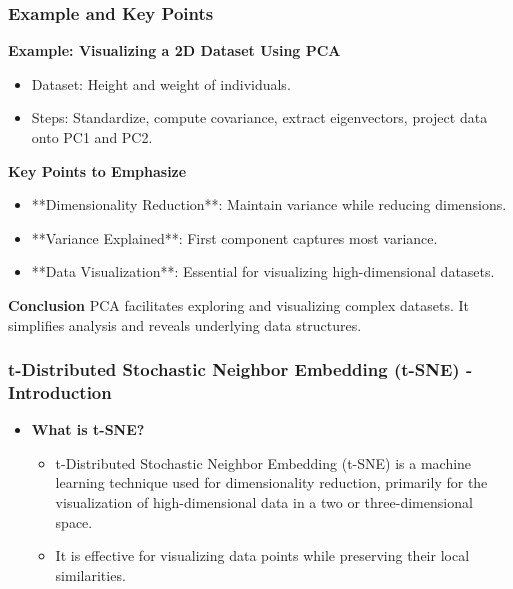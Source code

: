 \documentclass{beamer}
\begin{document}
\begin{frame}[fragile]
    \frametitle{Example and Key Points}
    \textbf{Example: Visualizing a 2D Dataset Using PCA}
    \begin{itemize}
        \item Dataset: Height and weight of individuals.
        \item Steps: Standardize, compute covariance, extract eigenvectors, project data onto PC1 and PC2.
    \end{itemize}
    
    \textbf{Key Points to Emphasize}
    \begin{itemize}
        \item **Dimensionality Reduction**: Maintain variance while reducing dimensions.
        \item **Variance Explained**: First component captures most variance.
        \item **Data Visualization**: Essential for visualizing high-dimensional datasets.
    \end{itemize}

    \textbf{Conclusion}
    PCA facilitates exploring and visualizing complex datasets. It simplifies analysis and reveals underlying data structures.
\end{frame}

\begin{frame}[fragile]
    \frametitle{t-Distributed Stochastic Neighbor Embedding (t-SNE) - Introduction}
    \begin{itemize}
        \item \textbf{What is t-SNE?}
        \begin{itemize}
            \item t-Distributed Stochastic Neighbor Embedding (t-SNE) is a machine learning technique used for dimensionality reduction, primarily for the visualization of high-dimensional data in a two or three-dimensional space.
            \item It is effective for visualizing data points while preserving their local similarities.
        \end{itemize}
    \end{itemize}
\end{frame}
\end{document}
